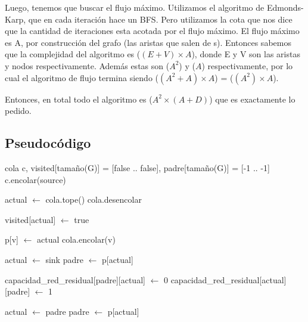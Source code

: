 \par{Luego, tenemos que buscar el flujo máximo. Utilizamos el algoritmo de Edmonds-Karp, que en cada iteración hace un BFS.
Pero utilizamos la cota que nos dice que la cantidad de iteraciones esta acotada por el flujo máximo. 
El flujo máximo es A, por construcción del grafo (las aristas que salen de s).
Entonces sabemos que la complejidad del algoritmo es \bigo($ (E + V) \times A$), donde E y V son las aristas y nodos respectivamente.
Además estas son \bigo($A^2$) y \bigo($A$) respectivamente, por lo cual el algoritmo de flujo termina siendo \bigo($ (A^2 + A) \times A$) 
= \bigo($ (A^2) \times A$). }

\par{Entonces, en total todo el algoritmo es \bigo($ A^2 \times (A + D) $) que es exactamente lo pedido.}


\subsection{Pseudocódigo}
	
\begin{algorithmic}
	\State cola c, visited[tamaño(G)] = [false .. false], padre[tamaño(G)] = [-1 .. -1]
	\State c.encolar(source)
	

		\State actual $\leftarrow$ cola.tope()
		\State cola.desencolar
		
		\State visited[actual] $\leftarrow$ true
	
		 
					\State p[v] $\leftarrow$ actual
					\State cola.encolar(v)
				\EndIf
		\EndFor 
	\EndWhile

		\State {} 
	\EndIf

	\State actual $\leftarrow$ sink
	\State padre $\leftarrow$ p[actual]
	
		\State capacidad_red_residual[padre][actual] $\leftarrow$ 0
		\State capacidad_red_residual[actual][padre] $\leftarrow$ 1
		
		\State actual $\leftarrow$ padre
		\State padre $\leftarrow$ p[actual]
	\EndWhile

	\State {} 
\EndFunction
\end{algorithmic}
\hspace{1cm}

